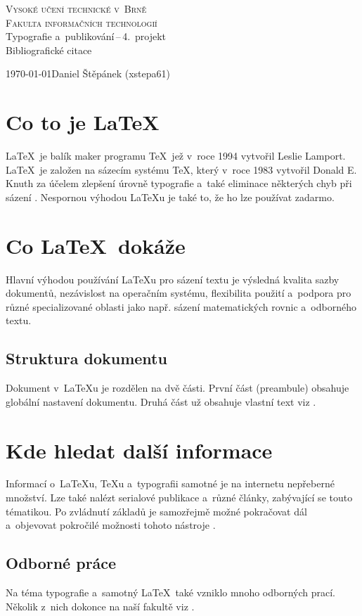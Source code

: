 \documentclass[a4paper, 11pt]{article}
\begin{document}
	\begin{titlepage}
		\begin{center}
			\Huge
			\textsc{Vysoké učení technické v~Brně} \\
			\huge
			\textsc{Fakulta informačních technologií} \\
			\LARGE
			Typografie a~publikování\,--\,4.~projekt \\
			\Huge
			Bibliografické citace
		\end{center}

{\LARGE \today \hfill Daniel Štěpánek (xstepa61)}
	\end{titlepage}

\section{Co to je \LaTeX}
\LaTeX \ je balík maker programu \TeX \ jež v~roce 1994 vytvořil Leslie Lamport. \LaTeX \ je založen na sázecím systému \TeX, který v~roce 1983 vytvořil Donald E. Knuth za účelem zlepšení úrovně typografie a~také eliminace některých chyb při sázení \cite{Kopkac2004}\cite{Simecek2013}. Nespornou výhodou \LaTeX u je také to, že ho lze používat zadarmo.

\section{Co \LaTeX \ dokáže}
Hlavní výhodou používání \LaTeX u pro sázení textu je výsledná kvalita sazby dokumentů, nezávislost na operačním systému, flexibilita použití a~podpora pro různé specializované oblasti jako např. sázení matematických rovnic a~odborného textu.


\subsection{Struktura dokumentu}
Dokument v~{\LaTeX}u je rozdělen na dvě části. První část (preambule) obsahuje globální nastavení dokumentu.
Druhá část už obsahuje vlastní text viz \cite{Rybicka2003}.


\section{Kde hledat další informace}
Informací o~\LaTeX u, \TeX u a~typografii samotné je na internetu nepřeberné množství. Lze také nalézt serialové publikace\cite{MackiewiczJ2003Wtws} a~různé články\cite{DemaineErikD.2015FwfA}\cite{BangWong2011PovT}, zabývající se touto tématikou. Po zvládnutí základů je samozřejmě možné pokračovat dál a~objevovat pokročilé možnosti tohoto nástroje \cite{Svamberg2001}\cite{Martinek2010}.

\subsection{Odborné práce}
Na téma typografie a~samotný \LaTeX \ také vzniklo mnoho odborných prací. Několik z~nich dokonce na naší fakultě viz \cite{Sokol2012} \cite{Simek2009}. 

\newpage

\renewcommand{\refname}{Literatura}

\end{document}

